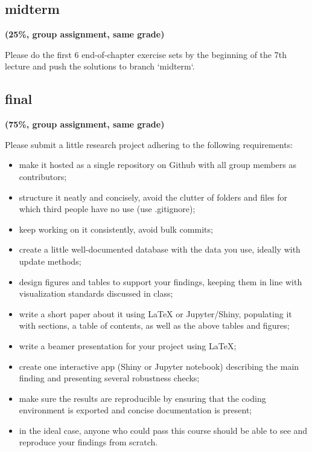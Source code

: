 \documentclass[12pt]{article}
\begin{document}
\subsection{midterm} %

\textbf{(25\%, group assignment, same grade)}

Please do the first 6 end-of-chapter exercise sets by the beginning of the 7th lecture and push the solutions to branch `midterm`.

\label{sub:midterm}


\subsection{final} %
\label{sub:final}

\textbf{(75\%, group assignment, same grade)}

Please submit a little research project adhering to the following requirements:

\begin{itemize}[topsep=0pt, itemsep=4pt, partopsep=0pt, parsep=0pt]
    \item make it hosted as a single repository on Github with all group members as contributors;
    \item structure it neatly and concisely, avoid the clutter of folders and files for which third people have no use (use .gitignore);
    \item keep working on it consistently, avoid bulk commits;
    \item create a little well-documented database with the data you use, ideally with update methods;
    \item design figures and tables to support your findings, keeping them in line with visualization standards discussed in class;
    \item write a short paper about it using LaTeX or Jupyter/Shiny, populating it with sections, a table of contents, as well as the above tables and figures;
    \item write a beamer presentation for your project using LaTeX;
    \item create one interactive app (Shiny or Jupyter notebook) describing the main finding and presenting several robustness checks;
    \item make sure the results are reproducible by ensuring that the coding environment is exported and concise documentation is present;
    \item in the ideal case, anyone who could pass this course should be able to see and reproduce your findings from scratch.
\end{itemize}


\end{document}
